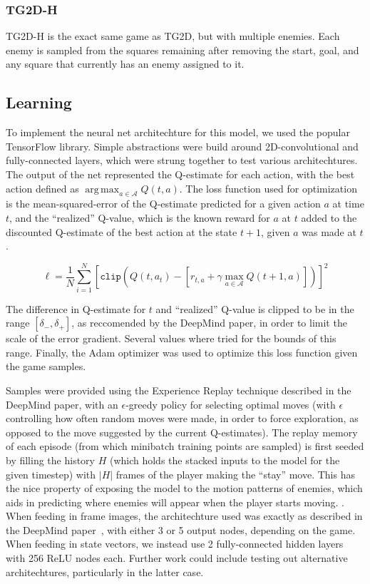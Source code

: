 \documentclass[12pt]{article}
\DeclareMathOperator*{\argmax}{arg\,max}
\begin{document}
\subsubsection{TG2D-H}

TG2D-H is the exact same game as TG2D, but with multiple enemies. Each enemy is sampled from the squares remaining after removing the start, goal, and any square that currently has an enemy assigned to it.

\subsection{Learning}

To implement the neural net architechture for this model, we used the popular TensorFlow library. Simple abstractions were build around 2D-convolutional and fully-connected layers, which were strung together to test various architechtures. The output of the net represented the Q-estimate for each action, with the best action defined as $\argmax_{a \in \mathcal{A}} Q(t, a)$. The loss function used for optimization is the mean-squared-error of the Q-estimate predicted for a given action $a$ at time $t$, and the ``realized'' Q-value, which is the known reward for $a$ at $t$ added to the discounted Q-estimate of the best action at the state $t+1$, given $a$ was made at $t$.

\[\ell = \frac{1}{N} \sum_{i=1}^{N} \left[\texttt{clip}\left(Q\left(t, a_t\right) - \left[r_{t,a}  + \gamma \max_{a \in \mathcal{A}} Q\left(t+1, a\right)\right]\right)\right]^2\]

The difference in Q-estimate for $t$ and ``realized'' Q-value is clipped to be in the range $[\delta_{-}, \delta_{+}]$, as reccomended by the DeepMind paper, in order to limit the scale of the error gradient. Several values where tried for the bounds of this range. Finally, the Adam optimizer was used to optimize this loss function given the game samples.

Samples were provided using the Experience Replay technique described in the DeepMind paper, with an $\epsilon$-greedy policy for selecting optimal moves (with $\epsilon$ controlling how often random moves were made, in order to force exploration, as opposed to the move suggested by the current Q-estimates). The replay memory of each episode (from which minibatch training points are sampled) is first seeded by filling the history $H$ (which holds the stacked inputs to the model for the given timestep) with $|H|$ frames of the player making the ``stay'' move. This has the nice property of exposing the model to the motion patterns of enemies, which aids in predicting where enemies will appear when the player starts moving.
.
When feeding in frame images, the architechture used was exactly as described in the DeepMind paper~\cite{deepmind}, with either 3 or 5 output nodes, depending on the game. When feeding in state vectors, we instead use 2 fully-connected hidden layers with 256 ReLU nodes each. Further work could include testing out alternative architechtures, particularly in the latter case.
\end{document}
